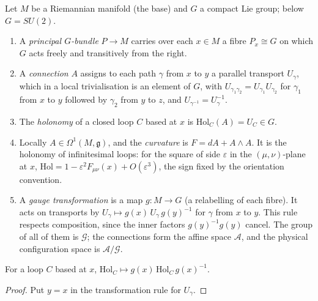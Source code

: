 \newpage
{}

\begin{definition}
Let $M$ be a Riemannian manifold (the base) and $G$ a compact Lie group; below $G=SU(2)$.
\begin{enumerate}[nosep,leftmargin=1.4em]
\item A \emph{principal $G$-bundle} $P\to M$ carries over each $x\in M$ a fibre $P_x\cong G$ on which $G$ acts freely
and transitively from the right.
\item A \emph{connection} $A$ assigns to each path $\gamma$ from $x$ to $y$ a parallel transport $U_\gamma$, which in
a local trivialisation is an element of $G$, with $U_{\gamma_1\gamma_2}=U_{\gamma_1}U_{\gamma_2}$ for $\gamma_1$
from $x$ to $y$ followed by $\gamma_2$ from $y$ to $z$, and $U_{\gamma^{-1}}=U_\gamma^{-1}$.
\item The \emph{holonomy} of a closed loop $C$ based at $x$ is $\mathrm{Hol}_C(A)=U_C\in G$.
\item Locally $A\in\Omega^1(M,\mathfrak{g})$, and the \emph{curvature} is $F=dA+A\wedge A$. It is the holonomy of
infinitesimal loops: for the square of side $\varepsilon$ in the $(\mu,\nu)$-plane at $x$,
$\mathrm{Hol}=1-\varepsilon^2F_{\mu\nu}(x)+O(\varepsilon^3)$, the sign fixed by the orientation convention.
\item A \emph{gauge transformation} is a map $g:M\to G$ (a relabelling of each fibre). It acts on transports by
$U_\gamma\mapsto g(x)\,U_\gamma\,g(y)^{-1}$ for $\gamma$ from $x$ to $y$. This rule respects composition, since the
inner factors $g(y)^{-1}g(y)$ cancel. The group of all of them is $\mathcal{G}$; the connections form the affine space
$\mathcal{A}$, and the physical configuration space is $\mathcal{A}/\mathcal{G}$.
\end{enumerate}
\end{definition}

\begin{lemma}\label{p1lem:holcov}
 For a loop $C$ based at $x$, $\mathrm{Hol}_C\mapsto g(x)\,\mathrm{Hol}_C\,g(x)^{-1}$.
\end{lemma}
\begin{proof}
Put $y=x$ in the transformation rule for $U_\gamma$.
\end{proof}

